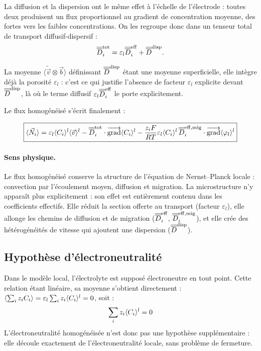 La diffusion et la dispersion ont le même effet à l'échelle de l'électrode :
toutes deux produisent un flux proportionnel au gradient de concentration
moyenne, des fortes vers les faibles concentrations. On les regroupe donc dans
un tenseur total de transport diffusif-dispersif :
\begin{equation}
\overline{\overline{D}}_i^{\mathrm{tot}}
=
\varepsilon_l \overline{\overline{D}}_i^{\mathrm{eff}}
+
\overline{\overline{D}}^{\mathrm{disp}}.
\end{equation}

La moyenne $\langle \tilde{\vec{v}} \otimes \vec{b} \rangle$ définissant $\overline{\overline{D}}^{\mathrm{disp}}$
étant une moyenne superficielle, elle intègre déjà la porosité $\varepsilon_l$ :
c'est ce qui justifie l'absence de facteur $\varepsilon_l$ explicite devant
$\overline{\overline{D}}^{\mathrm{disp}}$, là où le terme diffusif $\varepsilon_l \overline{\overline{D}}^{\mathrm{eff}}_i$
le porte explicitement.

Le flux homogénéisé s'écrit finalement :

\begin{equation}
\boxed{
\langle \vec{N}_i \rangle
=
\varepsilon_l \langle C_i \rangle^l \langle \vec{v} \rangle^l
-
\overline{\overline{D}}_i^{\mathrm{tot}}
\cdot\mathop{\overrightarrow{\operatorname{grad}}}\nolimits\langle C_i \rangle^l
-
\frac{z_iF}{RT}
\varepsilon_l
\langle C_i \rangle^l\,
\overline{\overline{D}}_i^{\mathrm{eff,mig}}
\cdot\mathop{\overrightarrow{\operatorname{grad}}}\nolimits\langle \varphi_l \rangle^l
}
\label{eq:Ni_final}
\end{equation}

\paragraph{Sens physique.} Le flux homogénéisé conserve la structure de
l'équation de Nernst--Planck locale : convection par l'écoulement moyen,
diffusion et migration. La microstructure n'y apparaît plus explicitement :
son effet est entièrement contenu dans les coefficients effectifs. Elle réduit
la section offerte au transport (facteur $\varepsilon_l$), elle allonge les
chemins de diffusion et de migration ($\overline{\overline{D}}_i^{\mathrm{eff}}$,
$\overline{\overline{D}}_i^{\mathrm{eff,mig}}$), et elle crée des hétérogénéités de vitesse
qui ajoutent une dispersion ($\overline{\overline{D}}^{\mathrm{disp}}$).

\subsection*{Hypothèse d'électroneutralité}
Dans le modèle local, l'électrolyte est supposé électroneutre en tout point.
Cette relation étant linéaire, sa moyenne s'obtient directement :
$\langle \sum_i z_iC_i \rangle = \varepsilon_l\sum_i z_i\langle C_i \rangle^l = 0$, soit :
\begin{equation}
\sum_i z_i \langle C_i \rangle^l = 0
\label{eq:electroneutre_homo}
\end{equation}
L'électroneutralité homogénéisée n'est donc pas une hypothèse supplémentaire :
elle découle exactement de l'électroneutralité locale, sans problème de
fermeture.

